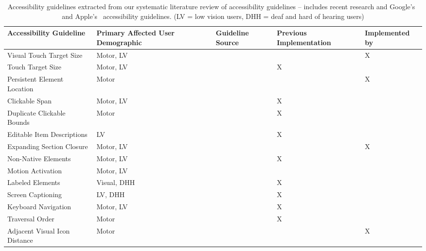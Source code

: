 \begin{table}[h]
	\centering
	\footnotesize
	\vspace{-0.5em}
	\caption{Accessibility guidelines extracted from our systematic literature review of accessibility guidelines -- includes recent research and Google's~\cite{GoogleAccess} and Apple's~\cite{AppleAccess} accessibility guidelines. (LV = low vision users, DHH = deaf and hard of hearing users)}
	\vspace{-1em}
	\begin{tabular}{>{\centering\arraybackslash}p{2in}|>{\centering\arraybackslash}p{1.8in}|>{\centering\arraybackslash}p{.82in}|>{\centering\arraybackslash}p{.82in}|>{\centering\arraybackslash}p{.82in} }
	
		\textbf{Accessibility Guideline} & \textbf{Primary Affected User Demographic} & \textbf{Guideline Source}  & \textbf{Previous Implementation} & \textbf{Implemented by \MotorEase} \\
		\hline
		Visual Touch Target Size & \footnotesize {Motor, LV} & \cite{Kong21, Parhi06} &  & X \\ 
		\rowcolor{gray!30!} Touch Target Size & \footnotesize {Motor, LV} & \cite{AppleAccess, GoogleAccess, HarvardAccess, WebGuide, Nunes15, Calvo16, Alshayban20, Abascal11, Kane11, Kong21} & X & \\ 
		Persistent Element Location & \footnotesize {Motor} &\cite{AppleAccess, HarvardAccess, WebGuide, GoogleAccess} &   & X \\
		\rowcolor{gray!30!} Clickable Span & \footnotesize {Motor, LV} & \cite{Alshayban20} & X{} &  \\
		Duplicate Clickable Bounds & \footnotesize {Motor} & \cite{Alshayban20} & X &  \\
		\rowcolor{gray!30!} Editable Item Descriptions & \footnotesize {LV} & \cite{Alshayban20, Eler18} & X{} &  \\
		Expanding Section Closure & \footnotesize {Motor, LV} & \cite{AppleAccess, GoogleAccess, HarvardAccess, WebGuide} &   & X\\
		\rowcolor{gray!30!} Non-Native Elements & \footnotesize {Motor, LV} & \cite{GoogleAccess, Calvo16}& X{} &  \\
		Motion Activation & \footnotesize {Motor, LV} & \cite{AppleAccess, GoogleAccess, HarvardAccess} &  & \\
		\rowcolor{gray!30!} Labeled Elements & \footnotesize {Visual, DHH} & \cite{Alshayban20, FlrezAristizbal19, Li21, Eler18} & X & \\
		Screen Captioning & \footnotesize {LV, DHH} & \cite{AppleAccess, GoogleAccess, HarvardAccess, WebGuide, ADAWeb, AccessGov, Ross18, Li21, Pavel20, Kane11}& X & \\
		\rowcolor{gray!30!}Keyboard Navigation & \footnotesize {Motor, LV} & \cite{ADAWeb, AccessGov, FlrezAristizbal19, Li21, Chiou21} & X & \\
		Traversal Order & \footnotesize {Motor} & \cite{AccessGov, Alshayban20, FlrezAristizbal19} & X & \\
		\rowcolor{gray!30!}Adjacent Visual Icon Distance & \footnotesize {Motor} & \cite{AppleAccess, GoogleAccess, WebGuide, Yan19, Abascal11, Nunes15} &  & X \\
		

\end{tabular}
\end{table}
